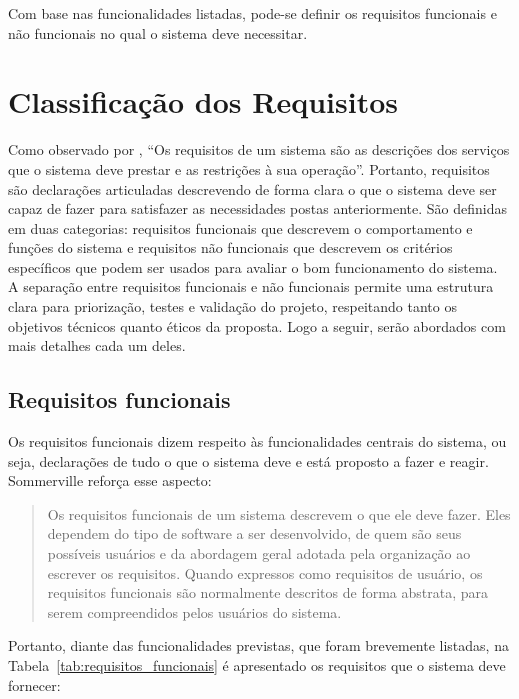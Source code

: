 Com base nas funcionalidades listadas, pode-se definir os requisitos funcionais
e não funcionais no qual o sistema deve necessitar.

\section{Classificação dos Requisitos}

Como observado por \cite[p.~58]{sommerville:2010}, ``Os requisitos de um sistema são
as descrições dos serviços que o sistema deve prestar e as restrições à sua
operação''. Portanto, requisitos são declarações articuladas descrevendo de
forma clara o que o sistema deve ser capaz de fazer para satisfazer as
necessidades postas anteriormente. São definidas em duas categorias: requisitos
funcionais que descrevem o comportamento e funções do sistema e requisitos não
funcionais que descrevem os critérios específicos que podem ser usados para
avaliar o bom funcionamento do sistema. A separação entre requisitos funcionais
e não funcionais permite uma estrutura clara para priorização, testes e
validação do projeto, respeitando tanto os objetivos técnicos quanto éticos da
proposta. Logo a seguir, serão abordados com mais detalhes cada um deles.

\subsection{Requisitos funcionais}

Os requisitos funcionais dizem respeito às funcionalidades centrais do sistema,
ou seja, declarações de tudo o que o sistema deve e está proposto a fazer e
reagir. Sommerville reforça esse aspecto:

\begin{quote}

  Os requisitos funcionais de um sistema descrevem o que ele deve fazer. Eles
  dependem do tipo de software a ser desenvolvido, de quem são seus possíveis
  usuários e da abordagem geral adotada pela organização ao escrever os
  requisitos. Quando expressos como requisitos de usuário, os requisitos
  funcionais são normalmente descritos de forma abstrata, para serem
  compreendidos pelos usuários do sistema.

  \cite[p.~59]{sommerville:2010}
\end{quote}

Portanto, diante das funcionalidades previstas, que foram brevemente listadas,
na Tabela~\ref{tab:requisitos_funcionais} é apresentado os requisitos que o
sistema deve fornecer:

